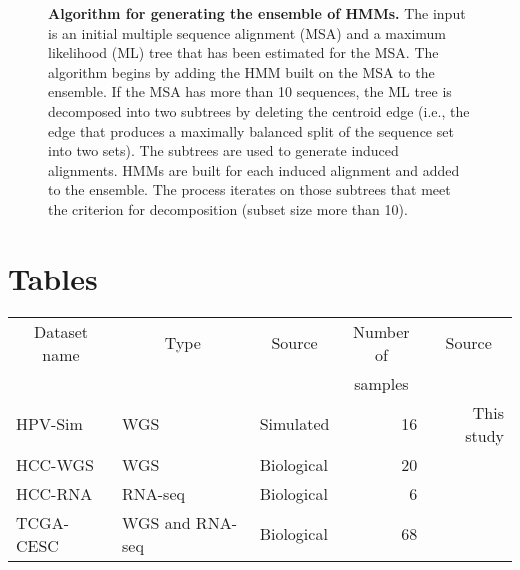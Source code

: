 \documentclass{bmcart}
\def\texttt{[image: ]}
\begin{document}
\begin{backmatter}
\begin{figure}[htpb]
  \centering
\caption[Ensemble of HMMs technique.]
{\label{ehmms}  {\bf Algorithm for generating the ensemble of HMMs.}  The input is an initial multiple sequence alignment (MSA) and a maximum likelihood (ML) tree that has been estimated for the MSA. The algorithm begins by adding the HMM built on the MSA to the ensemble. If the MSA has more than 10 sequences, the ML tree is decomposed into two subtrees by deleting the centroid edge (i.e., the edge that produces a maximally balanced split of the sequence set into two sets). The subtrees are used to generate induced alignments. HMMs are built for each induced alignment and added to the ensemble. The process iterates on those subtrees that meet the criterion for decomposition (subset size more than 10).}
\end{figure}

\section*{Tables}
\begin{table*}[htb]
\centering
\caption{\textbf{Overview of datasets}.  We provide an overview of the datasets used throughout this study.  }
\label{table:data}
\begin{tabular}{|l|l|l|r|r|}
\hline
\multicolumn{1}{|c|}{Dataset name} & \multicolumn{1}{|c|}{Type} & \multicolumn{1}{|c|}{Source} & \multicolumn{1}{|c|}{Number of} & \multicolumn{1}{|c|}{Source} \\ 
 &  &  & \multicolumn{1}{|c|}{samples} & \\ \hline 
HPV-Sim & WGS &Simulated& 16 & This study \\ \hline
HCC-WGS & WGS & Biological&20 & ~\cite{Sung2012}\\ \hline%
HCC-RNA & RNA-seq & Biological&6 & ~\cite{Lau2014} \\ \hline%
TCGA-CESC & WGS and RNA-seq &Biological& 68 & ~\cite{TCGA} \\ \hline %
\end{tabular}
\end{table*}


\end{backmatter}
\end{document}
